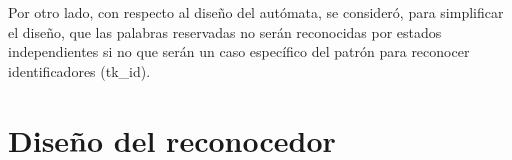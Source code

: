 Por otro lado, con respecto al diseño del autómata, se consideró, para simplificar el diseño, que las palabras reservadas no serán reconocidas por estados independientes si no que serán un caso específico del patrón para reconocer identificadores (tk\_id).

\section{Diseño del reconocedor}
\label{sec:lexico_reconocedor}

